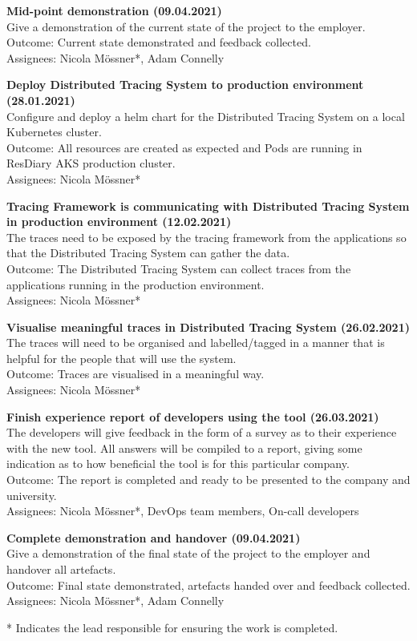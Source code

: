 \documentclass[11pt]{article}
\begin{document}
\textbf{Mid-point demonstration (09.04.2021)}\\
Give a demonstration of the current state of the project to the employer.\\
Outcome: Current state demonstrated and feedback collected.\\
Assignees: Nicola M\"{o}ssner*, Adam Connelly

\textbf{Deploy Distributed Tracing System to production environment (28.01.2021)}\\
Configure and deploy a helm chart for the Distributed Tracing System on a local Kubernetes cluster.\\
Outcome: All resources are created as expected and Pods are running in ResDiary AKS production cluster.\\
Assignees: Nicola M\"{o}ssner*

\textbf{Tracing Framework is communicating with Distributed Tracing System in production environment (12.02.2021)}\\
The traces need to be exposed by the tracing framework from the applications so that the Distributed Tracing System can gather the data.\\
Outcome: The Distributed Tracing System can collect traces from the applications running in the production environment.\\
Assignees: Nicola M\"{o}ssner*

\textbf{Visualise meaningful traces in Distributed Tracing System (26.02.2021)}\\
The traces will need to be organised and labelled/tagged in a manner that is helpful for the people that will use the system.\\
Outcome: Traces are visualised in a meaningful way.\\
Assignees: Nicola M\"{o}ssner*

\textbf{Finish experience report of developers using the tool (26.03.2021)}\\
The developers will give feedback in the form of a survey as to their experience with the new tool. All answers will be compiled to a report, giving some indication as to how beneficial the tool is for this particular company.\\
Outcome: The report is completed and ready to be presented to the company and university.\\
Assignees: Nicola M\"{o}ssner*, DevOps team members, On-call developers

\textbf{Complete demonstration and handover (09.04.2021)}\\
Give a demonstration of the final state of the project to the employer and handover all artefacts.\\
Outcome: Final state demonstrated, artefacts handed over and feedback collected.\\
Assignees: Nicola M\"{o}ssner*, Adam Connelly

* Indicates the lead responsible for ensuring the work is completed.




\end{document}
